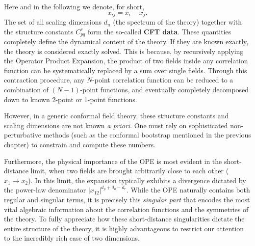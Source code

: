 Here and in the following we denote, for short,
\[
    x_{ij}=x_{i}-x_{j}.
\]
The set of all scaling dimensions \(d_n\) (the spectrum of the theory) together with the structure constants \(C_{pq}^{r}\) form the so-called \textbf{CFT data}. These quantities completely define the dynamical content of the theory. If they are known exactly, the theory is considered exactly solved. This is because, by recursively applying the Operator Product Expansion, the product of two fields inside any correlation function can be systematically replaced by a sum over single fields. Through this contraction procedure, any \(N\)-point correlation function can be reduced to a combination of \((N-1)\)-point functions, and eventually completely decomposed down to known 2-point or 1-point functions.

However, in a generic conformal field theory, these structure constants and scaling dimensions are not known \textit{a priori}. One must rely on sophisticated non-perturbative methods (such as the conformal bootstrap mentioned in the previous chapter) to constrain and compute these numbers.

Furthermore, the physical importance of the OPE is most evident in the short-distance limit, when two fields are brought arbitrarily close to each other (\(x_1 \to x_2\)). In this limit, the expansion typically exhibits a divergence dictated by the power-law denominator \(|x_{12}|^{d_{p}+d_{q}-d_{r}}\). While the OPE naturally contains both regular and singular terms, it is precisely this \textit{singular part} that encodes the most vital algebraic information about the correlation functions and the symmetries of the theory. To fully appreciate how these short-distance singularities dictate the entire structure of the theory, it is highly advantageous to restrict our attention to the incredibly rich case of two dimensions.
